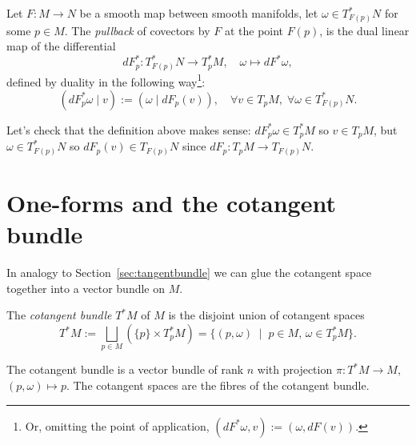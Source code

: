 \begin{definition}\label{def:pullback:oneform}
	Let $F:M\to N$ be a smooth map between smooth manifolds, let $\omega\in T^*_{F(p)}N$ for some $p\in M$.
	The \emph{pullback} of covectors by $F$ at the point $F(p)$, is the dual linear map of the differential
	\begin{equation}
		dF^*_p : T^*_{F(p)} N \to T^*_p M, \quad \omega \mapsto dF^*\omega,
	\end{equation}
	defined by duality in the following way\footnote{Or, omitting the point of application, $\left(dF^*\omega, v\right) := \left(\omega, dF(v)\right)$.}:
	\begin{equation}
		\left(dF^*_p\omega \mid v\right) := \left(\omega \mid dF_p(v)\right),\quad
		\forall v\in T_pM,\; \forall \omega\in T^*_{F(p)}N.
	\end{equation}
\end{definition}
\noindent Let's check that the definition above makes sense: $dF^*_p \omega \in T^*_p M$ so $v\in T_p M$, but $\omega\in T^*_{F(p)}N$ so $dF_p(v)\in T_{F(p)}N$ since $dF_p: T_pM\to T_{F(p)}N$.

\section{One-forms and the cotangent bundle}

In analogy to Section~\ref{sec:tangentbundle} we can glue the cotangent space together into a vector bundle on $M$.

\begin{definition}
	The \emph{cotangent bundle} $T^*M$ of $M$ is the disjoint union of cotangent spaces
	\begin{equation}
		T^*M := \bigsqcup_{p\in M}\left(\{p\}\times T^*_pM\right)
		= \{(p,\omega) \;\mid\; p\in M,\, \omega\in T^*_pM\}.
	\end{equation}
\end{definition}

The cotangent bundle is a vector bundle of rank $n$ with projection $\pi:T^*M\to M$, $(p,\omega)\mapsto p$.
The cotangent spaces are the fibres of the cotangent bundle.

